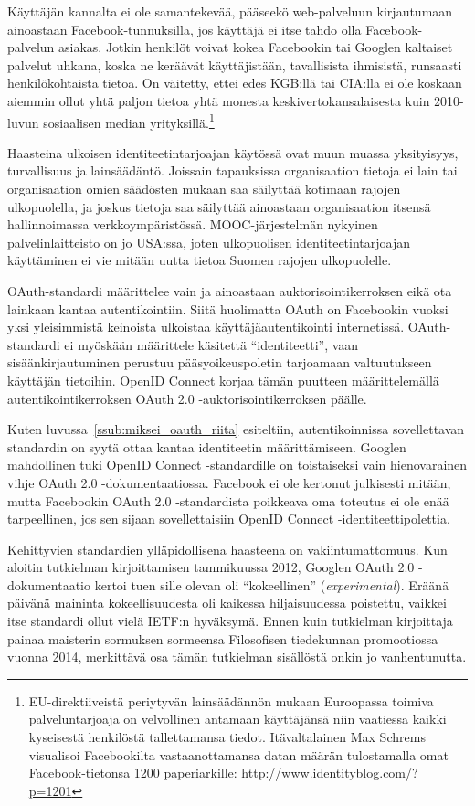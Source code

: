 \documentclass[finnish,gradu]{tktltiki}
\begin{document}
   Käyttäjän kannalta ei ole samantekevää, pääseekö web-palveluun kirjautumaan ainoastaan Facebook-tunnuksilla, jos käyttäjä ei itse tahdo olla Facebook-palvelun asiakas. Jotkin henkilöt voivat kokea Facebookin tai Googlen kaltaiset palvelut uhkana, koska ne keräävät käyttäjistään, tavallisista ihmisistä, runsaasti henkilökohtaista tietoa. On väitetty, ettei edes KGB:llä tai CIA:lla ei ole koskaan aiemmin ollut yhtä paljon tietoa yhtä monesta keskivertokansalaisesta kuin 2010-luvun sosiaalisen median yrityksillä.\footnote{
   EU-direktiiveistä periytyvän lainsäädännön mukaan Euroopassa toimiva palveluntarjoaja on velvollinen antamaan käyttäjänsä niin vaatiessa kaikki kyseisestä henkilöstä tallettamansa tiedot. Itävaltalainen Max Schrems visualisoi Facebookilta vastaanottamansa datan määrän tulostamalla omat Facebook-tietonsa 1200 paperiarkille: \url{http://www.identityblog.com/?p=1201}
   }

  Haasteina ulkoisen identiteetintarjoajan käytössä ovat muun muassa yksityisyys, turvallisuus ja lainsäädäntö. Joissain tapauksissa organisaation tietoja ei lain tai organisaation omien säädösten mukaan saa säilyttää kotimaan rajojen ulkopuolella, ja joskus tietoja saa säilyttää ainoastaan organisaation itsensä hallinnoimassa verkkoympäristössä. MOOC-järjestelmän nykyinen palvelinlaitteisto on jo USA:ssa, joten ulkopuolisen identiteetintarjoajan käyttäminen ei vie mitään uutta tietoa Suomen rajojen ulkopuolelle.

  OAuth-standardi määrittelee vain ja ainoastaan auktorisointikerroksen eikä ota lainkaan kantaa autentikointiin. Siitä huolimatta OAuth on Facebookin vuoksi yksi yleisimmistä keinoista ulkoistaa käyttäjäautentikointi internetissä. OAuth-standardi ei myöskään määrittele käsitettä ``identiteetti'', vaan sisäänkirjautuminen perustuu pääsyoikeuspoletin tarjoamaan valtuutukseen käyttäjän tietoihin. OpenID Connect korjaa tämän puutteen määrittelemällä autentikointikerroksen OAuth 2.0 -auktorisointikerroksen päälle.

  Kuten luvussa~\ref{ssub:miksei_oauth_riita} esiteltiin, autentikoinnissa sovellettavan standardin on syytä ottaa kantaa identiteetin määrittämiseen. Googlen mahdollinen tuki OpenID Connect -standardille on toistaiseksi vain hienovarainen vihje OAuth 2.0 -dokumentaatiossa. Facebook ei ole kertonut julkisesti mitään, mutta Facebookin OAuth 2.0 -standardista poikkeava oma toteutus ei ole enää tarpeellinen, jos sen sijaan sovellettaisiin OpenID Connect -identiteettipolettia.

  Kehittyvien standardien ylläpidollisena haasteena on vakiintumattomuus. Kun aloitin tutkielman kirjoittamisen tammikuussa 2012, Googlen OAuth 2.0 -dokumentaatio kertoi tuen sille olevan oli ``kokeellinen'' (\emph{experimental}). Eräänä päivänä maininta kokeellisuudesta oli kaikessa hiljaisuudessa poistettu, vaikkei itse standardi ollut vielä IETF:n hyväksymä. %
  Ennen kuin tutkielman kirjoittaja painaa maisterin sormuksen sormeensa Filosofisen tiedekunnan promootiossa vuonna 2014, merkittävä osa tämän tutkielman sisällöstä onkin jo vanhentunutta.





\newpage




\lastpage
\end{document}
